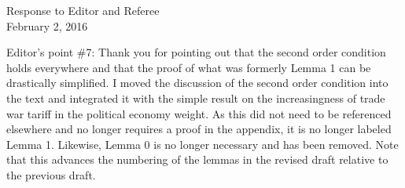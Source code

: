 \documentclass[12pt]{article}
\begin{document}
\begin{center}
\large Response to Editor and Referee \\
\normalsize February 2, 2016
\end{center}

Editor's point $\#$7: Thank you for pointing out that the second order condition holds everywhere and that the proof of what was formerly Lemma 1 can be drastically simplified. I moved the discussion of the second order condition into the text and integrated it with the simple result on the increasingness of trade war tariff in the political economy weight. As this did not need to be referenced elsewhere and no longer requires a proof in the appendix, it is no longer labeled Lemma 1. Likewise, Lemma 0 is no longer necessary and has been removed. Note that this advances the numbering of the lemmas in the revised draft relative to the previous draft. 
\end{document}
